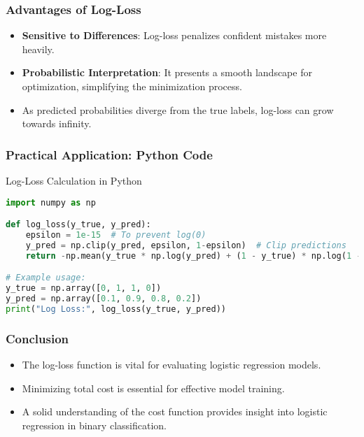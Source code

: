 \documentclass[aspectratio=169]{beamer}
\begin{document}
\begin{frame}[fragile]
    \frametitle{Advantages of Log-Loss}
    \begin{itemize}
        \item \textbf{Sensitive to Differences}: Log-loss penalizes confident mistakes more heavily.
        \item \textbf{Probabilistic Interpretation}: It presents a smooth landscape for optimization, simplifying the minimization process.
        \item As predicted probabilities diverge from the true labels, log-loss can grow towards infinity.
    \end{itemize}
\end{frame}

\begin{frame}[fragile]
    \frametitle{Practical Application: Python Code}
    \begin{block}{Log-Loss Calculation in Python}
        \begin{lstlisting}[language=Python]
import numpy as np

def log_loss(y_true, y_pred):
    epsilon = 1e-15  # To prevent log(0)
    y_pred = np.clip(y_pred, epsilon, 1-epsilon)  # Clip predictions
    return -np.mean(y_true * np.log(y_pred) + (1 - y_true) * np.log(1 - y_pred))

# Example usage:
y_true = np.array([0, 1, 1, 0])
y_pred = np.array([0.1, 0.9, 0.8, 0.2])
print("Log Loss:", log_loss(y_true, y_pred))
        \end{lstlisting}
    \end{block}
\end{frame}

\begin{frame}[fragile]
    \frametitle{Conclusion}
    \begin{itemize}
        \item The log-loss function is vital for evaluating logistic regression models.
        \item Minimizing total cost is essential for effective model training.
        \item A solid understanding of the cost function provides insight into logistic regression in binary classification.
    \end{itemize}
\end{frame}
\end{document}
